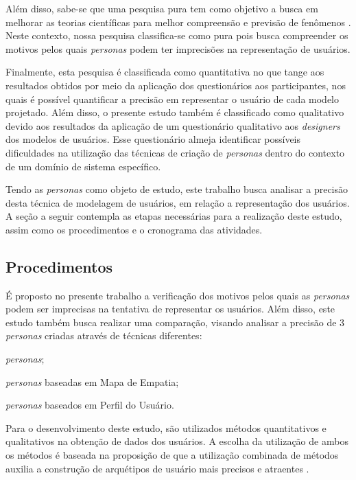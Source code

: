 \documentclass[12pt]{article}
\begin{document}
Além disso, sabe-se que uma pesquisa pura tem como objetivo a busca em melhorar as teorias científicas para melhor compreensão e previsão de fenômenos \cite{1954-06834-000}. Neste contexto, nossa pesquisa classifica-se como pura pois busca compreender os motivos pelos quais \emph{personas} podem ter imprecisões na representação de usuários. 

\par Finalmente, esta pesquisa é classificada como quantitativa no que tange aos resultados obtidos por meio da aplicação dos questionários aos participantes, nos quais é possível quantificar a precisão em representar o usuário de cada modelo projetado. Além disso, o presente estudo também é classificado como qualitativo devido aos resultados da aplicação de um questionário qualitativo aos \emph{designers} dos modelos de usuários. Esse questionário almeja identificar possíveis dificuldades na utilização das técnicas de criação de \emph{personas} dentro do contexto de um domínio de sistema específico.

\par Tendo as \emph{personas} como objeto de estudo, este trabalho busca analisar a precisão desta técnica de modelagem de usuários, em relação a representação dos usuários. A seção a seguir contempla as etapas necessárias para a realização deste estudo, assim como os procedimentos e o cronograma das atividades.

\subsection{Procedimentos}
\par É proposto no presente trabalho a verificação dos motivos pelos quais as \emph{personas} podem ser imprecisas na tentativa de representar os usuários. Além disso, este estudo também busca realizar uma comparação, visando analisar a precisão de 3 \emph{personas} criadas através de técnicas diferentes: 
\begin{enumerate*}[label=\roman*)]
    \item \emph{personas};
    \item \emph{personas} baseadas em Mapa de Empatia;
    \item \emph{personas} baseados em Perfil do Usuário.
\end{enumerate*} 

Para o desenvolvimento deste estudo, são utilizados métodos quantitativos e qualitativos na obtenção de dados dos usuários. A escolha da utilização de ambos os métodos é baseada na proposição de que a utilização combinada de métodos auxilia a construção de arquétipos de usuário mais precisos e atraentes \cite{10.1145/3313831.3376502}.
       
\end{document}
